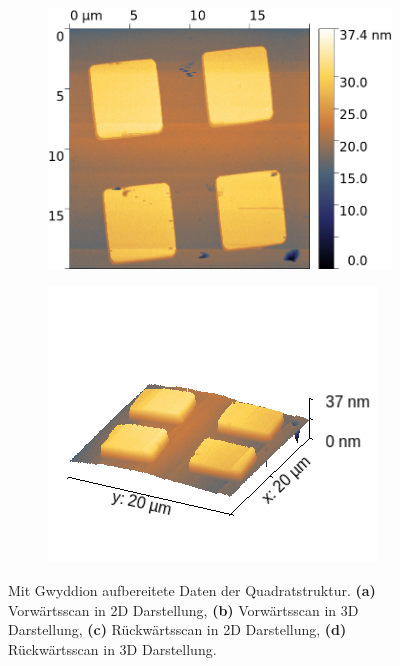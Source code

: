 \begin{figure}[H]
\begin{subfigure}{0.49\textwidth}
        \includegraphics[width=\textwidth]{bilder/Mikrostruktur/Quadrat_Bac_2D.png}
        \caption{}
    \end{subfigure}
    \begin{subfigure}{0.49\textwidth}
        \includegraphics[width=\textwidth]{bilder/Mikrostruktur/Quadrat_Bac_3D.png}
        \caption{}
    \end{subfigure}
    \caption{Mit Gwyddion aufbereitete Daten der Quadratstruktur. \textbf{(a)} Vorwärtsscan in 2D Darstellung, \textbf{(b)} Vorwärtsscan in 3D Darstellung, \textbf{(c)} Rückwärtsscan in 2D Darstellung, \textbf{(d)} Rückwärtsscan in 3D Darstellung.}
    \label{fig:Quadrate}
\end{figure}

